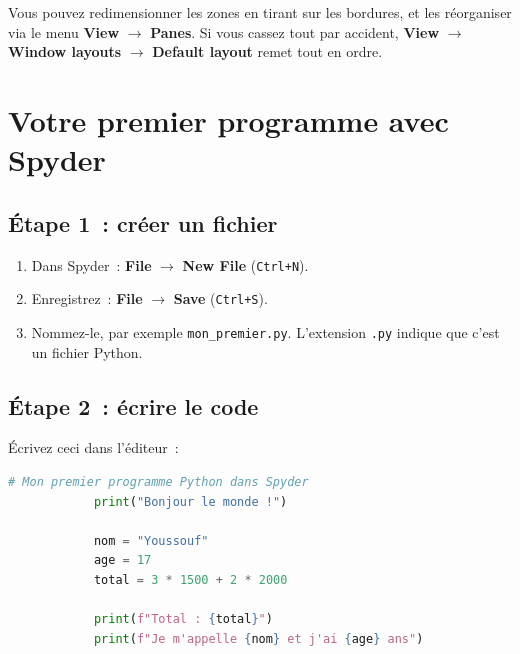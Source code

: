 \documentclass[12pt,a4paper]{article}
\begin{document}
	\begin{astuce}
		Vous pouvez redimensionner les zones en tirant sur les bordures, et les réorganiser via le menu \textbf{View} $\rightarrow$ \textbf{Panes}. Si vous cassez tout par accident, \textbf{View} $\rightarrow$ \textbf{Window layouts} $\rightarrow$ \textbf{Default layout} remet tout en ordre.
	\end{astuce}
	
	\section{Votre premier programme avec Spyder}
	
	\subsection{Étape 1~: créer un fichier}
	
	\begin{etape}
		\begin{enumerate}
			\item Dans Spyder~: \textbf{File} $\rightarrow$ \textbf{New File} (\texttt{Ctrl+N}).
			\item Enregistrez~: \textbf{File} $\rightarrow$ \textbf{Save} (\texttt{Ctrl+S}).
			\item Nommez-le, par exemple \texttt{mon\_premier.py}. L'extension \texttt{.py} indique que c'est un fichier Python.
		\end{enumerate}
	\end{etape}
	
	\subsection{Étape 2~: écrire le code}
	
	\begin{etape}
		Écrivez ceci dans l'éditeur~:
		\begin{lstlisting}[language=Python]
			# Mon premier programme Python dans Spyder
			print("Bonjour le monde !")
			
			nom = "Youssouf"
			age = 17
			total = 3 * 1500 + 2 * 2000
			
			print(f"Total : {total}")
			print(f"Je m'appelle {nom} et j'ai {age} ans")
		\end{lstlisting}
	\end{etape}
	
\end{document}
